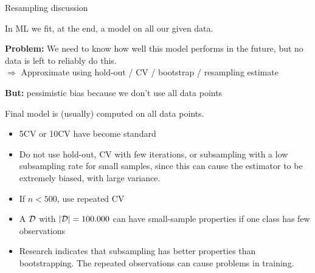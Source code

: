 \documentclass[11pt,compress,t,notes=noshow, xcolor=table]{beamer}
\begin{document}
% 

\begin{vbframe}{Resampling discussion}

In ML we fit, at the end, a model on all our given data.\\

\lz

\textbf{Problem:} We need to know how well this model performs in the future, 
but no data is left to reliably do this.\\

$\Rightarrow$ Approximate using hold-out / CV / bootstrap / resampling estimate\\ 

\lz

\textbf{But:} pessimistic bias because we don't use all data points\\

\lz 

Final model is (usually) computed on all data points.


\framebreak

\begin{itemize}
  \item 5CV or 10CV have become standard
  \item Do not use hold-out, CV with few iterations, or subsampling with a low subsampling rate for small samples, since this can cause the estimator to be extremely biased, with large variance.
  \item If $n < 500$, use 
  repeated CV
  \item A $\mathcal{D}$ with $|\mathcal{D}| = 100.000$ can have small-sample properties if one class has few observations 
  \item Research indicates that subsampling has better properties than
    bootstrapping. The repeated observations can cause problems in training.
\end{itemize}
\end{vbframe}

\endlecture
\end{document}
